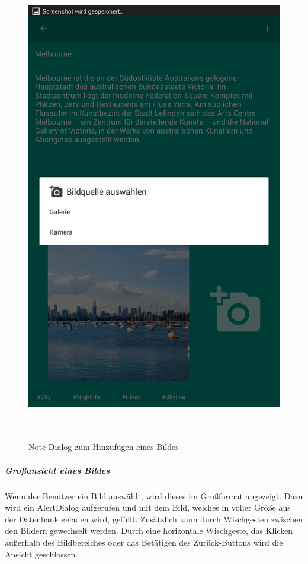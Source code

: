 \begin{figure}[H]
\centering
\begin{minipage}[t]{1\textwidth} %
\caption{Note Dialog zum Hinzufügen eines Bildes} %
\includegraphics[height=20cm]{img/note_addImage}\\ %
\end{minipage}
\end{figure}

\subparagraph{Großansicht eines Bildes}
Wenn der Benutzer ein Bild auswählt, wird dieses im Großformat angezeigt. Dazu wird ein AlertDialog aufgerufen und mit dem Bild, welches in voller Größe aus der Datenbank geladen wird, gefüllt. Zusätzlich kann durch Wischgesten zwischen den Bildern gewechselt werden. Durch eine horizontale Wischgeste, das Klicken außerhalb des Bildbereiches oder das Betätigen des Zurück-Buttons wird die Ansicht geschlossen.

